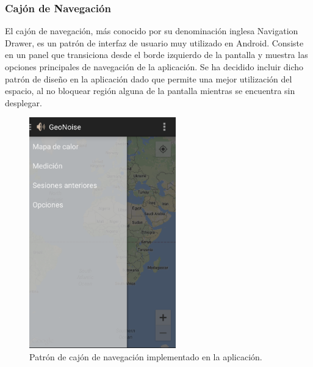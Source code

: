 \subsubsection{Cajón de Navegación}
El cajón de navegación, más conocido por su denominación inglesa Navigation Drawer, es un patrón de interfaz de usuario muy utilizado en Android. Consiste en un panel que transiciona desde el borde izquierdo de la pantalla y muestra las opciones principales de navegación de la aplicación. Se ha decidido incluir dicho patrón de diseño en la aplicación dado que permite una mejor utilización del espacio, al no bloquear región alguna de la pantalla mientras se encuentra sin desplegar.

 \begin{figure}[h] \centering
    \includegraphics[height=10cm]{graphs/navdrawer.png} \caption{Patrón de cajón de navegación implementado en la aplicación.}\label{fig:navdrawer}
\end{figure}

\filbreak
